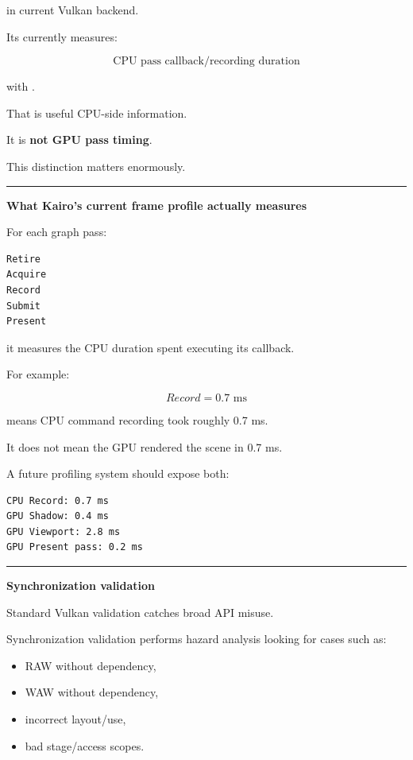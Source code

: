 in current Vulkan backend.

Its  currently measures:

\[
\boxed{\text{CPU pass callback/recording duration}}
\]

with .

That is useful CPU-side information.

It is \textbf{not GPU pass timing}.

This distinction matters enormously.

\begin{center}\rule{0.5\linewidth}{0.5pt}\end{center}

\textbf{What Kairo's current frame profile actually measures}

For each graph pass:

\begin{verbatim}
Retire
Acquire
Record
Submit
Present
\end{verbatim}

it measures the CPU duration spent executing its callback.

For example:

\[
Record=0.7\text{ ms}
\]

means CPU command recording took roughly 0.7 ms.

It does not mean the GPU rendered the scene in 0.7 ms.

A future profiling system should expose both:

\begin{verbatim}
CPU Record: 0.7 ms
GPU Shadow: 0.4 ms
GPU Viewport: 2.8 ms
GPU Present pass: 0.2 ms
\end{verbatim}

\begin{center}\rule{0.5\linewidth}{0.5pt}\end{center}

\textbf{Synchronization validation}

Standard Vulkan validation catches broad API misuse.

Synchronization validation performs hazard analysis looking for cases such as:

\begin{itemize}
\tightlist
\item
  RAW without dependency,
\item
  WAW without dependency,
\item
  incorrect layout/use,
\item
  bad stage/access scopes.
\end{itemize}

